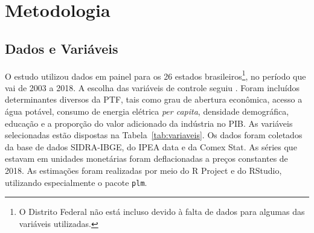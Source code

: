 \documentclass[
  12pt,
  a4paper,
  oneside,
  brazil,
  chapter=TITLE,
  section=TITLE
]{abntex2}
\begin{document}
\chapter{Metodologia}

\section{Dados e Variáveis}

O estudo utilizou dados em painel para os 26 estados brasileiros\footnote{O Distrito Federal não está incluso devido à falta de dados para algumas das variáveis utilizadas.}, no período que vai de 2003 a 2018. A escolha das variáveis de controle seguiu . Foram incluídos determinantes diversos da PTF, tais como grau de abertura econômica, acesso a água potável, consumo de energia elétrica \textit{per capita}, densidade demográfica, educação e a proporção do valor adicionado da indústria no PIB. As variáveis selecionadas estão dispostas na Tabela~\ref{tab:variaveis}. Os dados foram coletados da base de dados SIDRA-IBGE, do IPEA data e da Comex Stat. As séries que estavam em unidades monetárias foram deflacionadas a preços constantes de 2018. As estimações foram realizadas por meio do R Project e do RStudio, utilizando especialmente o pacote \texttt{plm}.
\end{document}
